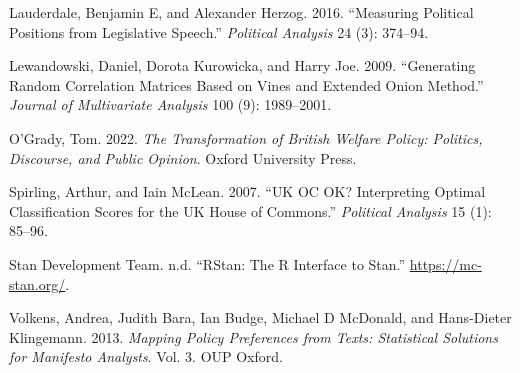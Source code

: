 \documentclass[
]{article}
\newlength{\cslhangindent}
\newenvironment{CSLReferences}[2] %
 {\begin{list}{}{%
  \setlength{\itemindent}{0pt}
  \setlength{\leftmargin}{0pt}
  \setlength{\parsep}{0pt}
  \ifodd #1
   \setlength{\leftmargin}{\cslhangindent}
   \setlength{\itemindent}{-1\cslhangindent}
  \fi
  \setlength{\itemsep}{#2\baselineskip}}}
 {\end{list}}
\begin{document}
\begin{CSLReferences}{1}{0}
Lauderdale, Benjamin E, and Alexander Herzog. 2016. {``Measuring
Political Positions from Legislative Speech.''} \emph{Political
Analysis} 24 (3): 374--94.

Lewandowski, Daniel, Dorota Kurowicka, and Harry Joe. 2009.
{``Generating Random Correlation Matrices Based on Vines and Extended
Onion Method.''} \emph{Journal of Multivariate Analysis} 100 (9):
1989--2001.

O'Grady, Tom. 2022. \emph{The Transformation of {B}ritish Welfare
Policy: Politics, Discourse, and Public Opinion}. Oxford University
Press.

Spirling, Arthur, and Iain McLean. 2007. {``{UK OC OK}? Interpreting
Optimal Classification Scores for the {UK} {H}ouse of {C}ommons.''}
\emph{Political Analysis} 15 (1): 85--96.

Stan Development Team. n.d. {``{RStan}: The {R} Interface to {Stan}.''}
\url{https://mc-stan.org/}.

Volkens, Andrea, Judith Bara, Ian Budge, Michael D McDonald, and
Hans-Dieter Klingemann. 2013. \emph{Mapping Policy Preferences from
Texts: Statistical Solutions for Manifesto Analysts}. Vol. 3. OUP
Oxford.

\end{CSLReferences}
\end{document}
